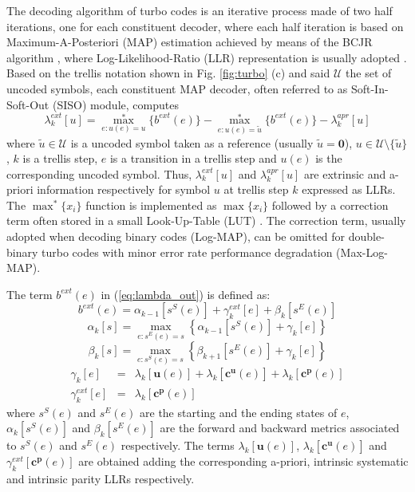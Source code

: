\documentclass[10pt,twocolumn,journal]{IEEEtran}
\begin{document}
The decoding algorithm of turbo codes is an iterative process made of two half iterations, one for each constituent 
decoder, where each half iteration is based on Maximum-A-Posteriori (MAP) estimation 
achieved by means of the BCJR algorithm \cite{bahl_TrIT94}, where Log-Likelihood-Ratio (LLR) representation is 
usually adopted \cite{robertson_ICC95}. 
Based on the trellis notation shown in Fig. \ref{fig:turbo} (c) and said $\mathcal{U}$ the set of uncoded symbols, 
each constituent MAP decoder, often referred to as Soft-In-Soft-Out (SISO) module, computes 
\begin{equation}
 \lambda^{ext}_k[u] = \max^*_{e:u(e)=u} \{ b^{ext}(e) \} - \max^*_{e:u(e)=\tilde{u}} \{ b^{ext}(e) \} - \lambda^{apr}_k[u]
\label{eq:lambda_out}
\end{equation}
where $\tilde{u} \in \mathcal{U}$ is a uncoded symbol taken as a reference (usually $\tilde{u}=\mathbf{0}$), 
$u \in \mathcal{U} \setminus \{\tilde{u}\}$, 
$k$ is a trellis step, $e$ is a transition in a trellis step and $u(e)$ is the corresponding uncoded symbol. 
Thus, $\lambda^{ext}_k[u]$ and $\lambda^{apr}_k[u]$ are extrinsic and a-priori information respectively 
for symbol $u$ at trellis step $k$ expressed as LLRs.
The $\displaystyle{\max^* \{x_i\}}$ function is implemented as 
$\max\{x_i\}$ followed by a correction term often stored in a small Look-Up-Table (LUT) 
\cite{robertson_ETT97, martina_CL09}. 
The correction term, usually adopted when decoding binary
codes (Log-MAP), can be omitted for double-binary turbo codes with minor error rate performance degradation (Max-Log-MAP). 

The term $b^{ext}(e)$ in (\ref{eq:lambda_out}) is defined as:
\begin{equation}
b^{ext}(e) = \alpha_{k-1} [s^S(e)] + \gamma^{ext}_k[e] + \beta_k[s^E(e)]  
\label{eq:be}
\end{equation}
\begin{equation}
\alpha_k[s] = \max_{e:s^E(e)=s} 
              \left\{ \alpha_{k-1}[s^S(e)] + \gamma_k[e] \right\}
\label{eq:alpha}
\end{equation}
\begin{equation}
\beta_k[s] = \max_{e:s^S(e)=s} \left\{ \beta_{k+1}[s^E(e)] + \gamma_k[e] \right\}
\label{eq:beta}
\end{equation}
\begin{eqnarray}
\gamma_k[e] & = & \lambda_k[\mathbf{u}(e)] + \lambda_k[\mathbf{c^u}(e)] + \lambda_k[\mathbf{c^p}(e)] \\
\gamma^{ext}_k[e] & = & \lambda_k[\mathbf{c^p}(e)]
\label{eq:gamma}
\end{eqnarray}
where $s^S(e)$ and $s^E(e)$ are the starting and the ending states of 
$e$, $\alpha_k[s^S(e)]$ and $\beta_k[s^E(e)]$ are 
the forward and backward metrics associated to 
$s^S(e)$ and $s^E(e)$ respectively. 
The terms $\lambda_k[\mathbf{u}(e)]$, $\lambda_k[\mathbf{c^u}(e)]$ and $\gamma^{ext}_k[\mathbf{c^p}(e)]$ are obtained 
adding the corresponding a-priori, intrinsic systematic and intrinsic parity LLRs respectively. 
\end{document}

